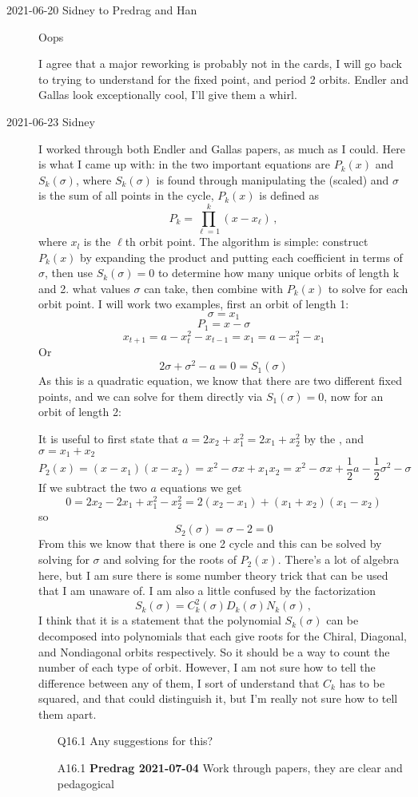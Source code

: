 \begin{description}
\item[2021-06-20 Sidney to Predrag and Han]
Oops
\vspace{3mm}

I agree that a major reworking is probably not in the cards, I will go back
to trying to understand {\jacobianOrbs} for the fixed point, and period 2
orbits. Endler and Gallas look
exceptionally cool, I'll give them a whirl.

\item[2021-06-23 Sidney]
I worked through both Endler and Gallas papers, as much as I could.
Here is what I came up with: in  the two important equations are
$P_k(x)$ and $S_k(\sigma)$, where $S_k(\sigma)$ is found through manipulating
the (scaled) {\HenonMap} and $\sigma$ is the sum of all points in the cycle,
$P_k(x)$ is defined as
\[P_k=\prod_{\ell=1}^k(x-x_\ell)\,,\]
where $x_l$ is the $\ell$th orbit point. The algorithm is simple: construct
$P_k(x)$ by expanding the product and putting each coefficient in terms of
$\sigma$, then use $S_k(\sigma)=0$ to determine how many unique orbits of
length k and 2. what values $\sigma$ can take, then combine with $P_k(x)$ to
solve for each orbit point. I will work two examples, first an orbit of
length 1:
$$\sigma=x_1$$
$$P_1=x-\sigma$$
$$x_{t+1}=a-x_t^2-x_{t-1}=x_1=a-x_1^2-x_1$$
Or
$$2\sigma+\sigma^2-a=0=S_1(\sigma)$$
As this is a quadratic equation, we know that there are two different fixed
points, and we can solve for them directly via $S_1(\sigma)=0$, now for an
orbit of length 2:

It is useful to first state that $a=2x_2+x_1^2=2x_1+x_2^2$ by the
{\HenonMap}, and $\sigma=x_1+x_2$
$$P_2(x)=(x-x_1)(x-x_2)=x^2-\sigma x+x_1x_2
        =x^2-\sigma x+\frac{1}{2}a-\frac{1}{2}\sigma^2-\sigma$$
If we subtract the two $a$ equations we get
$$0=2x_2-2x_1+x_1^2-x_2^2=2(x_2-x_1)+(x_1+x_2)(x_1-x_2)$$
so
$$S_2(\sigma)=\sigma-2=0$$
From this we know that there is one 2 cycle and this can be solved by solving
for $\sigma$ and solving for the roots of $P_2(x)$. There's a lot of algebra
here, but I am sure there is some number theory trick that can be used that I
am unaware of. I am also a little confused by the factorization 
\[
S_k(\sigma)=C_k^2(\sigma)D_k(\sigma)N_k(\sigma)
\,,
\]
I think that it is a
statement that the polynomial $S_k(\sigma)$ can be decomposed into
polynomials that each give roots for the Chiral, Diagonal, and Nondiagonal
orbits respectively. So it should be a way to count the number of each type
of orbit. However, I am not sure how to tell the difference between any of
them, I sort of understand that $C_k$ has to be squared, and that could
distinguish it, but I'm really not sure how to tell them apart.
\begin{itemize}
	\item[Q16.1] Any suggestions for this?
	\item[A16.1] {\bf Predrag 2021-07-04}
Work through papers, they are clear and pedagogical
\end{itemize}


\end{description}

